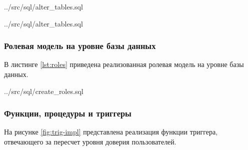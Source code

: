 \begin{code}
    \begin{lstinputlisting}[
            caption={Ограничения Sentence},
            firstline=119,
            lastline=125,
        ]{../src/sql/alter_tables.sql}
    \end{lstinputlisting}
\end{code}

\begin{code}
    \begin{lstinputlisting}[
            label={lst:cons:token},
            caption={Ограничения Token},
            firstline=127,
            lastline=133,
        ]{../src/sql/alter_tables.sql}
    \end{lstinputlisting}
\end{code}

\newpage

\subsubsection{Ролевая модель на уровне базы данных}

В листинге \ref{lst:roles} приведена реализованная ролевая модель на уровне базы данных.

\begin{code}
    \begin{lstinputlisting}[
            label={lst:roles},
            caption={Создание ролей и пользователей},
            firstline=1,
            lastline=25,
        ]{../src/sql/create_roles.sql}
    \end{lstinputlisting}
\end{code}

\newpage

\subsubsection{Функции, процедуры и триггеры}

На рисунке \ref{fig:trig-impl} представлена реализация функции триггера, отвечающего за пересчет уровня доверия пользователей.

